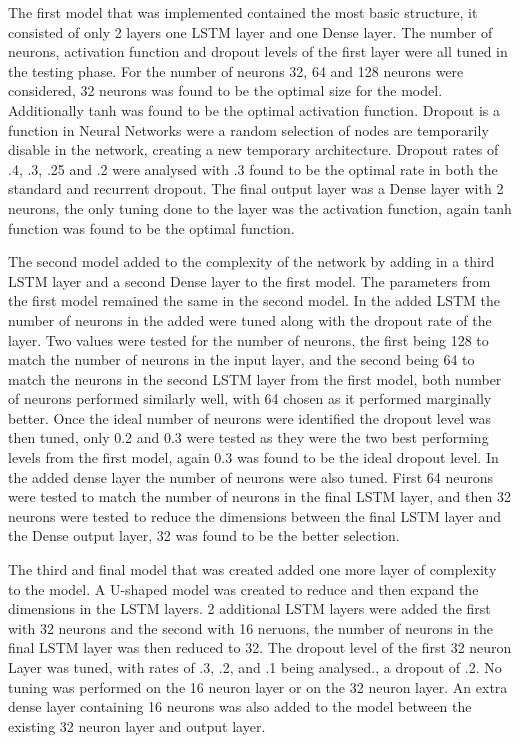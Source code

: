 \documentclass{imc-inf}
\begin{document}
	The first model that was implemented contained the most basic structure, it consisted of only 2 layers one LSTM layer and one Dense layer. The number of neurons, activation function and dropout levels of the first layer were all tuned in the testing phase. For the number of neurons 32, 64 and 128 neurons were considered, 32 neurons was found to be the optimal size for the model. Additionally tanh was found to be the optimal activation function. Dropout is a function in Neural Networks were a random selection of nodes are temporarily disable in the network, creating a new temporary architecture. Dropout rates of .4, .3, .25 and .2  were analysed with .3 found to be the optimal rate in both the standard and recurrent dropout.  The final output layer was a Dense layer with 2 neurons, the only tuning done to the layer was the activation function, again tanh function was found to be the optimal function.
	\newline
	
	The second model added to the complexity of the network by adding in a third LSTM layer and a second Dense layer to the first model. The parameters from the first model remained the same in the second model. In the added LSTM the number of neurons in the added were tuned along with the dropout rate of the layer. Two values were tested for the number of neurons, the first being 128 to match the number of neurons in the input layer, and the second being 64 to match the neurons in the second LSTM layer from the first model, both number of neurons performed similarly well, with 64 chosen as it performed marginally better. Once the ideal number of neurons were identified the dropout level was then tuned, only 0.2 and 0.3 were tested as they were the two best performing levels from the first model, again 0.3 was found to be the ideal dropout level. In the added dense layer the number of neurons were also tuned. First 64 neurons were tested to match the number of neurons in the final LSTM layer, and then 32 neurons were tested to reduce the dimensions between the final LSTM layer and the Dense output layer, 32 was found to be the better selection. 
	\newline
	
	The third and final model that was created added one more layer of complexity to the model. A U-shaped model was created to reduce and then expand the dimensions in the LSTM layers. 2 additional LSTM layers were added the first with 32 neurons and the second with 16 neruons, the number of neurons in the final LSTM layer was then reduced to 32. The dropout level of the first 32 neuron Layer was tuned, with rates of .3, .2, and .1 being analysed., a dropout of .2. No tuning was performed on the 16 neuron layer or on the 32 neuron layer. An extra dense layer containing 16 neurons was also added to the model between the existing 32 neuron layer and output layer.
	\newline
	
\end{document}
